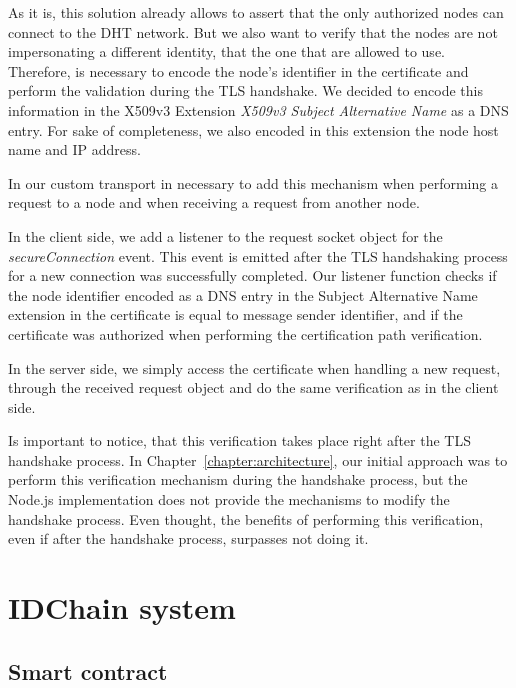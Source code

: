 

As it is, this solution already allows to assert that the only authorized nodes can connect to the DHT network.
But we also want to verify that the nodes are not impersonating a different identity, that the one that are allowed to use.
Therefore, is necessary to encode the node's identifier in the certificate and perform the validation during the TLS handshake.
We decided to encode this information in the X509v3 Extension \textit{X509v3 Subject Alternative Name} as a DNS entry.
For sake of completeness, we also encoded in this extension the node host name and IP address.

In our custom transport in necessary to add this mechanism when performing a request to a node and when receiving a request from another node.

In the client side, we add a listener to the request socket object for the \textit{secureConnection} event.
This event is emitted after the TLS handshaking process for a new connection was successfully completed.
Our listener function checks if the node identifier encoded as a DNS entry in the Subject Alternative Name extension in the certificate is equal to message sender identifier, and if the certificate was authorized when performing the certification path verification.


In the server side, we simply access the certificate when handling a new request, through the received request object and do the same verification as in the client side.

Is important to notice, that this verification takes place right after the TLS handshake process.
In Chapter~\ref{chapter:architecture}, our initial approach was to perform this verification mechanism during the handshake process, but the Node.js implementation does not provide the mechanisms to modify the handshake process.
Even thought, the benefits of performing this verification, even if after the handshake process, surpasses not doing it.

\section{IDChain system}\label{implementation:idchain}

\subsection{Smart contract}

